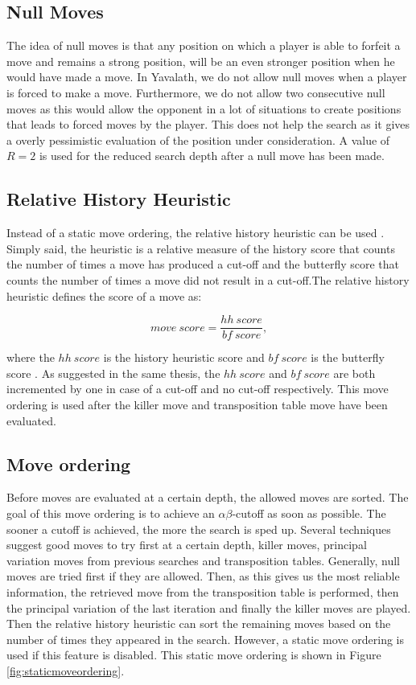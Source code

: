 \documentclass[11pt]{article}
\begin{document}
\subsection{Null Moves}
\label{-subsec:nullmoves}
The idea of null moves is that any position on which a player is able to forfeit a move and remains a strong position, will be an even stronger position when he would have made a move. In Yavalath, we do not allow null moves when a player is forced to make a move. Furthermore, we do not allow two consecutive null moves as this would allow the opponent in a lot of situations to create positions that leads to forced moves by the player. This does not help the search as it gives a overly pessimistic evaluation of the position under consideration. A value of $R=2$ is used for the reduced search depth after a null move has been made.

\subsection{Relative History Heuristic}
\label{-subsec:relativehistoryheuristic}
Instead of a static move ordering, the relative history heuristic can be used \cite{Herik}. Simply said, the heuristic is a relative measure of the history score that counts the number of times a move has produced a cut-off and the butterfly score that counts the number of times a move did not result in a cut-off.The relative history heuristic defines the score of a move as:

\begin{equation}
	move\ score = \frac{hh\ score}{bf\ score},
\end{equation}

where the $hh\ score$ is the history heuristic score and $bf\ score$ is the butterfly score \cite{Winands2004}. As suggested in the same thesis, the $hh\ score$ and $bf\ score$ are both incremented by one in case of a cut-off and no cut-off respectively. This move ordering is used after the killer move and transposition table move have been evaluated.

\subsection{Move ordering}
\label{-subsec:moveordering}
Before moves are evaluated at a certain depth, the allowed moves are sorted. The goal of this move ordering is to achieve an $\alpha\beta$-cutoff as soon as possible. The sooner a cutoff is achieved, the more the search is sped up. Several techniques suggest good moves to try first at a certain depth, killer moves, principal variation moves from previous searches and transposition tables. Generally, null moves are tried first if they are allowed. Then, as this gives us the most reliable information, the retrieved move from the transposition table is performed, then the principal variation of the last iteration and finally the killer moves are played. Then the relative history heuristic can sort the remaining moves based on the number of times they appeared in the search. However, a static move ordering is used if this feature is disabled. This static move ordering is shown in Figure \ref{fig:staticmoveordering}.
\end{document}
